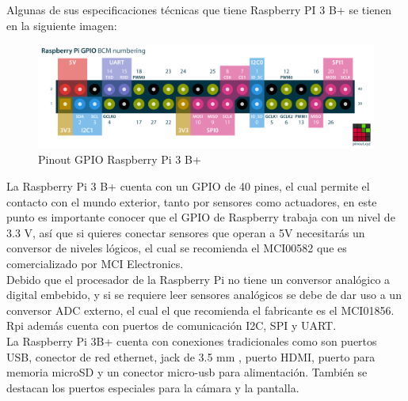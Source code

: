\documentclass[12pt,titlepage]{article}
\begin{document}
Algunas de sus especificaciones técnicas que tiene Raspberry PI 3 B+  se tienen en la siguiente imagen: \\ 

\begin{figure}[htbp]
\hspace*{2.2cm} 
\includegraphics[scale=0.42]{GPIO_RPI}
\caption{Pinout GPIO Raspberry Pi 3 B+}
\end{figure}
\newpage
La Raspberry Pi 3 B+ cuenta con un GPIO de 40 pines, el cual permite el contacto con el mundo exterior, tanto por sensores como actuadores, en este punto es importante conocer que el GPIO de Raspberry trabaja con un nivel de 3.3 V, así que si quieres conectar sensores que operan a 5V necesitarás un conversor de niveles lógicos, el cual se recomienda el MCI00582 que es comercializado por MCI Electronics. \\

Debido que el procesador de la Raspberry Pi no tiene un conversor analógico a digital embebido, y si se requiere leer sensores analógicos se debe de dar uso a un conversor ADC externo, el cual el que recomienda el fabricante es el MCI01856. 
Rpi además cuenta con puertos de comunicación I2C, SPI y UART. \\[0.8mm] 

La Raspberry Pi 3B+ cuenta con conexiones tradicionales como son puertos USB,  conector de red ethernet, jack de 3.5 mm , puerto HDMI, puerto para memoria microSD y un conector micro-usb para alimentación. También se destacan los puertos especiales para la cámara y la pantalla. \\ \\ [0.8mm] 
\end{document}
